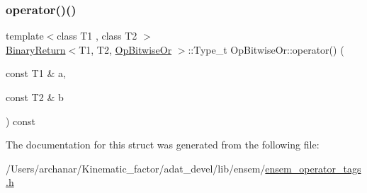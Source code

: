 \mbox{\label{structOpBitwiseOr_a05a68ce8b7a79808447ed381afb810be}} 
\subsubsection{\texorpdfstring{operator()()}{operator()()}\hspace{0.1cm}{\footnotesize\ttfamily [2/2]}}
{\footnotesize\ttfamily template$<$class T1 , class T2 $>$ \\
\mbox{\hyperlink{structBinaryReturn}{Binary\+Return}}$<$T1, T2, \mbox{\hyperlink{structOpBitwiseOr}{Op\+Bitwise\+Or}} $>$\+::Type\+\_\+t Op\+Bitwise\+Or\+::operator() (\begin{DoxyParamCaption}\item[{const T1 \&}]{a,  }\item[{const T2 \&}]{b }\end{DoxyParamCaption}) const\hspace{0.3cm}{\ttfamily [inline]}}



The documentation for this struct was generated from the following file\+:\begin{DoxyCompactItemize}
\item 
/\+Users/archanar/\+Kinematic\+\_\+factor/adat\+\_\+devel/lib/ensem/\mbox{\hyperlink{lib_2ensem_2ensem__operator__tags_8h}{ensem\+\_\+operator\+\_\+tags.\+h}}\end{DoxyCompactItemize}
